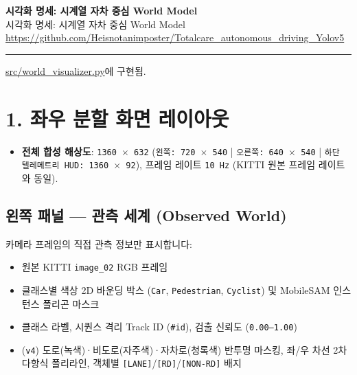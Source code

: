 \documentclass[10.5pt,a4paper]{article}
\begin{document}
\begin{center}
{\LARGE\bfseries 시각화 명세: 시계열 자차 중심 World Model}\\[6pt]
{\normalsize\color{gray} 시각화 명세: 시계열 자차 중심 World Model}\\[4pt]
{\small\href{https://github.com/Heisnotanimposter/Totalcare_autonomous_driving_Yolov5}{https://github.com/Heisnotanimposter/Totalcare\_autonomous\_driving\_Yolov5}}
\end{center}
\vspace{4pt}
\hrule
\vspace{8pt}

\href{https://github.com/Heisnotanimposter/Totalcare\_autonomous\_driving\_Yolov5/blob/main/src/world\_visualizer.py}{src/world\_visualizer.py}에 구현됨.


\section{1. 좌우 분할 화면 레이아웃}

\begin{itemize}[leftmargin=1.5em,itemsep=2pt]
\item \textbf{전체 합성 해상도}: \texttt{1360 $\times$ 632} (\texttt{왼쪽:\allowbreak{} 720 $\times$ 540} | \texttt{오른쪽:\allowbreak{} 640 $\times$ 540} | \texttt{하단 텔레메트리 HUD:\allowbreak{} 1360 $\times$ 92}), 프레임 레이트 \texttt{10 Hz} (KITTI 원본 프레임 레이트와 동일).
\end{itemize}

\subsection{왼쪽 패널 --- 관측 세계 (Observed World)}
카메라 프레임의 직접 관측 정보만 표시합니다:

\begin{itemize}[leftmargin=1.5em,itemsep=2pt]
\item 원본 KITTI \texttt{image\_\allowbreak{}02} RGB 프레임
\item 클래스별 색상 2D 바운딩 박스 (\texttt{Car}, \texttt{Pedestrian}, \texttt{Cyclist}) 및 MobileSAM 인스턴스 폴리곤 마스크
\item 클래스 라벨, 시퀀스 격리 Track ID (\texttt{\#id}), 검출 신뢰도 (\texttt{0.\allowbreak{}00--1.\allowbreak{}00})
\item (\texttt{v4}) 도로(녹색)·비도로(자주색)·자차로(청록색) 반투명 마스킹, 좌/우 차선 2차 다항식 폴리라인, 객체별 \texttt{[LANE]}/\texttt{[RD]}/\texttt{[NON-\allowbreak{}RD]} 배지
\end{itemize}
\end{document}
